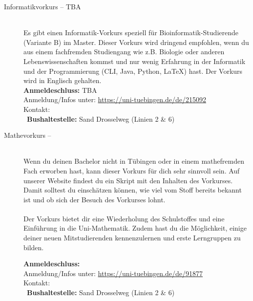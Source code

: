 \begin{description}
\ifmaster
    \ifbinfo
        \item[Informatikvorkurs -- TBA]\ \\
		Es gibt einen Informatik-Vorkurs speziell für Bioinformatik-Studierende (Variante B) im Master. 
		Dieser Vorkurs wird dringend empfohlen, wenn du aus einem fachfremden Studiengang wie z.B. Biologie oder anderen Lebenswissenschaften kommst und nur wenig Erfahrung in der Informatik und der Programmierung (CLI, Java, Python, \LaTeX) hast. Der Vorkurs wird in Englisch gehalten. \\
		\textbf{Anmeldeschluss:} TBA\\
		Anmeldung/Infos unter: \url{https://uni-tuebingen.de/de/215092}\\
		Kontakt: \texttt{\bioinfoKontakt}\\
        ~\textbf{Bushaltestelle:} Sand Drosselweg (Linien 2 \& 6)
    \fi
\fi

\ifmaster
	\ifml %
	\else
		\ifkogwiss %
		\else
			\item[Mathevorkurs -- \mathedatum~\YEAR]~\\
			Wenn du deinen Bachelor nicht in Tübingen oder in einem mathefremden Fach erworben hast, kann dieser Vorkurs für dich sehr sinnvoll sein. Auf unserer Website findest du ein Skript mit den Inhalten des Vorkurses. Damit solltest du einschätzen können, wie viel vom Stoff bereits bekannt ist und ob sich der Besuch des Vorkurses lohnt.\\\\
			Der Vorkurs bietet dir eine Wiederholung des Schulstoffes und eine Einführung in die Uni-Mathematik. Zudem hast du die Möglichkeit, einige deiner neuen Mitstudierenden kennenzulernen und erste Lerngruppen zu bilden.

			\textbf{Anmeldeschluss:} \matheanmeldung\YEAR\\
			Anmeldung/Infos unter: \url{https://uni-tuebingen.de/de/91877}\\
			Kontakt: \texttt{\mathkontakt}\\
			\ifsommersemester
			~\textbf{Bushaltestelle:} Sand Drosselweg (Linien 2 \& 6) 
			\fi
		\fi
	\fi
\fi


\end{description}
